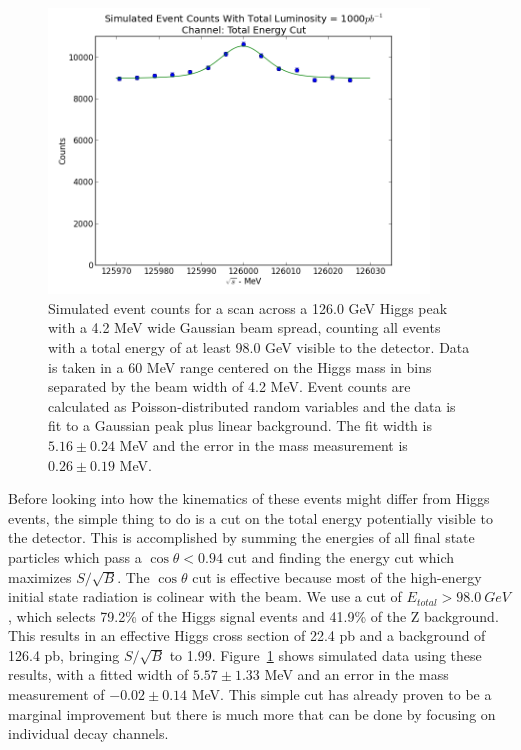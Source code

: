 \documentclass[a4paper]{article}
\begin{document}
\begin{figure}[h]
	\includegraphics[width=0.9\textwidth]{data-fit-total-cut}
	\caption{Simulated event counts for a scan across a 126.0 GeV Higgs peak with a 4.2 MeV wide Gaussian beam spread, counting all events with a total energy of at least 98.0 GeV visible to the detector. Data is taken in a 60 MeV range centered on the Higgs mass in bins separated by the beam width of 4.2 MeV. Event counts are calculated as Poisson-distributed random variables and the data is fit to a Gaussian peak plus linear background. The fit width is $5.16\pm0.24$ MeV and the error in the mass measurement is $0.26\pm0.19$ MeV.}
\label{data-fit-total-cut}
\end{figure}

Before looking into how the kinematics of these events might differ from Higgs events, the simple thing to do is a cut on the total energy potentially visible to the detector. This is accomplished by summing the energies of all final state particles which pass a $\cos{\theta} < 0.94$ cut and finding the energy cut which maximizes $S/\sqrt{B}$. The $\cos{\theta}$ cut is effective because most of the high-energy initial state radiation is colinear with the beam. We use a cut of $E_{total} > 98.0\ GeV$, which selects 79.2\% of the Higgs signal events and 41.9\% of the Z background. This results in an effective Higgs cross section of 22.4 pb and a background of 126.4 pb, bringing $S/\sqrt{B}$ to 1.99. Figure~\ref{data-fit-total-cut} shows simulated data using these results, with a fitted width of $5.57\pm 1.33$ MeV and an error in the mass measurement of $-0.02\pm0.14$ MeV. This simple cut has already proven to be a marginal improvement but there is much more that can be done by focusing on individual decay channels.
\end{document}
